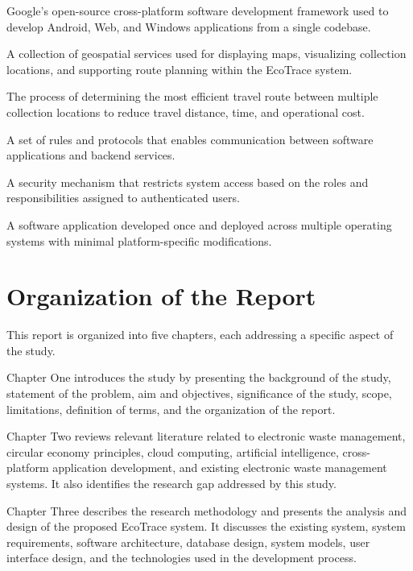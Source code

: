 \begin{description}[leftmargin=0cm,style=nextline]
  \item[Flutter] Google's open-source cross-platform software development
    framework used to develop Android, Web, and Windows applications from a
    single codebase.
  \item[Google Maps Platform] A collection of geospatial services used for
    displaying maps, visualizing collection locations, and supporting route planning
    within the EcoTrace system.
  \item[Route Optimization] The process of determining the most efficient travel
    route between multiple collection locations to reduce travel distance, time, and
    operational cost.
  \item[Application Programming Interface (API)] A set of rules and protocols
    that enables communication between software applications and backend
    services.
  \item[Role-Based Access Control (RBAC)] A security mechanism that restricts
    system access based on the roles and responsibilities assigned to authenticated
    users.
  \item[Cross-Platform Application] A software application developed once and
    deployed across multiple operating systems with minimal platform-specific
    modifications.
\end{description}

\section{Organization of the Report}
\label{sec:organization}

This report is organized into five chapters, each addressing a specific aspect of the
study.

Chapter One introduces the study by presenting the background of the study,
statement of the problem, aim and objectives, significance of the study, scope,
limitations, definition of terms, and the organization of the report.

Chapter Two reviews relevant literature related to electronic waste management,
circular economy principles, cloud computing, artificial intelligence, cross-platform
application development, and existing electronic waste management systems. It also
identifies the research gap addressed by this study.

Chapter Three describes the research methodology and presents the analysis
and design of the proposed EcoTrace system. It discusses the existing system, system
requirements, software architecture, database design, system models, user interface
design, and the technologies used in the development process.

